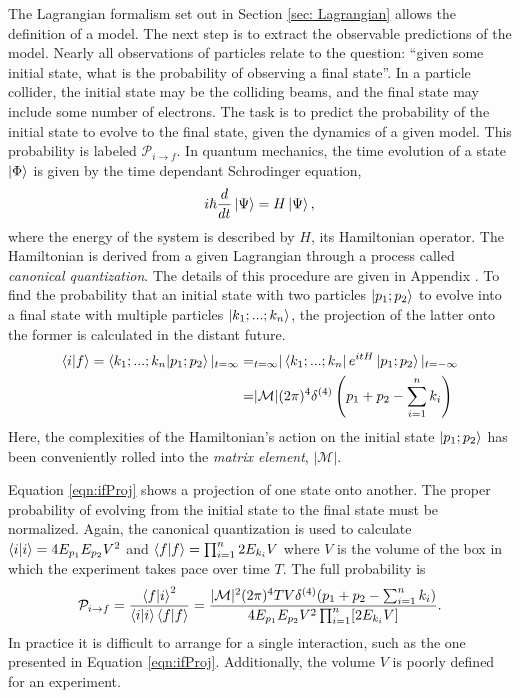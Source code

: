 The Lagrangian formalism set out in Section \ref{sec: Lagrangian} allows the definition of a model.
The next step is to extract the observable predictions of the model.
Nearly all observations of particles relate to the question: ``given some initial state, what is the probability of observing a final state''.
In a particle collider, the initial state may be the colliding beams, and the final state may include some number of electrons.
The task is to predict the probability of the initial state to evolve to the final state, given the dynamics of a given model.
This probability is labeled $\mathcal{P}_{i\to f}$.
In quantum mechanics, the time evolution of a state $\ket{\Phi}$ is given by the time dependant Schrodinger equation,
\begin{equation}\begin{split}\label{eqn:schrodinger}
i\hbar\frac{d}{dt}\ket{\Psi}=H\ket{\Psi},
\end{split}\end{equation} 
where the energy of the system is described by $H$, its Hamiltonian operator.
The Hamiltonian is derived from a given Lagrangian through a process called \emph{canonical quantization}. The details of this procedure are given in Appendix \label{sec:canQuant}.
To find the probability that an initial state with two particles $\ket{p_1;p_2}$ to evolve into a final state with multiple particles $\ket{k_1;...;k_n}$, the projection of the latter onto the former is calculated in the distant future.
\begin{equation}\begin{split}\label{eqn:ifProj}
\braket{i|f}=\braket{k_1;...;k_n|p_1;p_2}|_{t=\infty}=&_{t=\infty}|\bra{k_1;...;k_n}e^{itH}\ket{p_1;p_2}|_{t=-\infty} \\
=&|\mathcal{M}|(2\pi)^4\delta^{(4)}\left(p_1+p_2-\sum^n_{i=1} k_i\right) \\
\end{split}\end{equation} 
Here, the complexities of the Hamiltonian's action on the initial state $\ket{p_1;p_2}$ has been conveniently rolled into the \emph{matrix element}, $|\mathcal{M}|$.

Equation \ref{eqn:ifProj} shows a projection of one state onto another.
The proper probability of evolving from the initial state to the final state must be normalized.
Again, the canonical quantization is used to calculate $\braket{i|i}=4E_{p_1}E_{p_2}V^2$ and $\braket{f|f}=\prod_{i=1}^n2E_{k_i}V$ where $V$ is the volume of the box in which the experiment takes pace over time $T$.
The full probability is
\begin{equation}\begin{split}\label{eqn:ifProb}
    \mathcal{P}_{i\to f}=\frac{\braket{f|i}^2}{\braket{i|i}\braket{f|f}}=\frac{|\mathcal{M}|^2(2\pi)^4TV\delta^{(4)}(p_1+p_2-\sum^n_{i=1} k_i)}{4E_{p_1}E_{p_2}V^2\prod_{i=1}^n[2E_{k_i}V]}.
\end{split}\end{equation} 
In practice it is difficult to arrange for a single interaction, such as the one presented in Equation \ref{eqn:ifProj}.
Additionally, the volume $V$ is poorly defined for an experiment.

